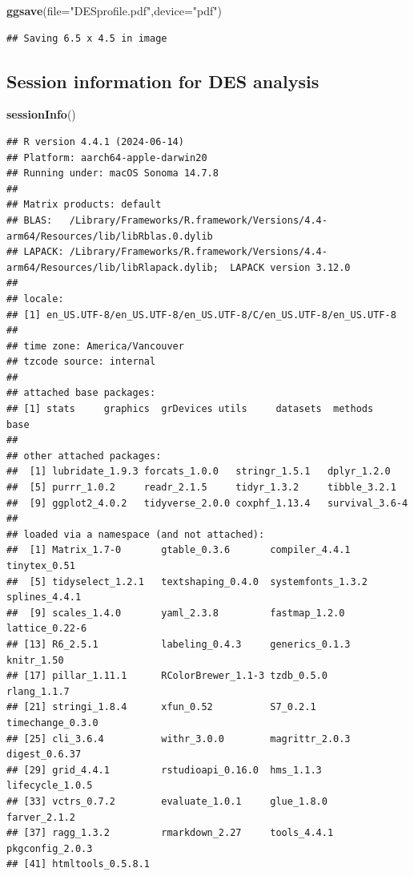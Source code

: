 \documentclass[
]{article}
\newenvironment{Shaded}{\begin{snugshade}}{\end{snugshade}}
\newcommand{\AttributeTok}[1]{\textcolor[rgb]{0.13,0.29,0.53}{#1}}
\newcommand{\FunctionTok}[1]{\textcolor[rgb]{0.13,0.29,0.53}{\textbf{#1}}}
\newcommand{\NormalTok}[1]{#1}
\newcommand{\StringTok}[1]{\textcolor[rgb]{0.31,0.60,0.02}{#1}}
\begin{document}
\begin{Shaded}
\begin{Highlighting}[]
\FunctionTok{ggsave}\NormalTok{(}\AttributeTok{file=}\StringTok{"DESprofile.pdf"}\NormalTok{,}\AttributeTok{device=}\StringTok{"pdf"}\NormalTok{)}
\end{Highlighting}
\end{Shaded}

\begin{verbatim}
## Saving 6.5 x 4.5 in image
\end{verbatim}

\subsection{Session information for DES
analysis}\label{session-information-for-des-analysis}

\begin{Shaded}
\begin{Highlighting}[]
\FunctionTok{sessionInfo}\NormalTok{()}
\end{Highlighting}
\end{Shaded}

\begin{verbatim}
## R version 4.4.1 (2024-06-14)
## Platform: aarch64-apple-darwin20
## Running under: macOS Sonoma 14.7.8
## 
## Matrix products: default
## BLAS:   /Library/Frameworks/R.framework/Versions/4.4-arm64/Resources/lib/libRblas.0.dylib 
## LAPACK: /Library/Frameworks/R.framework/Versions/4.4-arm64/Resources/lib/libRlapack.dylib;  LAPACK version 3.12.0
## 
## locale:
## [1] en_US.UTF-8/en_US.UTF-8/en_US.UTF-8/C/en_US.UTF-8/en_US.UTF-8
## 
## time zone: America/Vancouver
## tzcode source: internal
## 
## attached base packages:
## [1] stats     graphics  grDevices utils     datasets  methods   base     
## 
## other attached packages:
##  [1] lubridate_1.9.3 forcats_1.0.0   stringr_1.5.1   dplyr_1.2.0    
##  [5] purrr_1.0.2     readr_2.1.5     tidyr_1.3.2     tibble_3.2.1   
##  [9] ggplot2_4.0.2   tidyverse_2.0.0 coxphf_1.13.4   survival_3.6-4 
## 
## loaded via a namespace (and not attached):
##  [1] Matrix_1.7-0       gtable_0.3.6       compiler_4.4.1     tinytex_0.51      
##  [5] tidyselect_1.2.1   textshaping_0.4.0  systemfonts_1.3.2  splines_4.4.1     
##  [9] scales_1.4.0       yaml_2.3.8         fastmap_1.2.0      lattice_0.22-6    
## [13] R6_2.5.1           labeling_0.4.3     generics_0.1.3     knitr_1.50        
## [17] pillar_1.11.1      RColorBrewer_1.1-3 tzdb_0.5.0         rlang_1.1.7       
## [21] stringi_1.8.4      xfun_0.52          S7_0.2.1           timechange_0.3.0  
## [25] cli_3.6.4          withr_3.0.0        magrittr_2.0.3     digest_0.6.37     
## [29] grid_4.4.1         rstudioapi_0.16.0  hms_1.1.3          lifecycle_1.0.5   
## [33] vctrs_0.7.2        evaluate_1.0.1     glue_1.8.0         farver_2.1.2      
## [37] ragg_1.3.2         rmarkdown_2.27     tools_4.4.1        pkgconfig_2.0.3   
## [41] htmltools_0.5.8.1
\end{verbatim}
\end{document}
